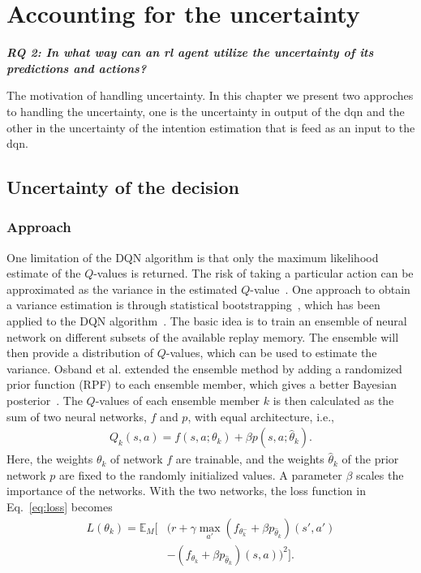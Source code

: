 \chapter{Accounting for the uncertainty}\label{ch:uncertainty}
\begin{center}
	\textit{\textbf{RQ 2: In what way can an \gls{rl} agent utilize the uncertainty of its predictions and actions?}}
	\end{center}
	\vspace{12pt}

The motivation of handling uncertainty. In this chapter we present two approches to handling the uncertainty, one is the uncertainty in output of the \gls{dqn} and the other in the uncertainty of the intention estimation that is feed as an input to the \gls{dqn}.


\section{Uncertainty of the decision}


\subsection{Approach}
One limitation of the DQN algorithm is that only the maximum likelihood estimate of the $Q$-values is returned. The risk of taking a particular action can be approximated as the variance in the estimated $Q$-value~\cite{Garcia2015}. One approach to obtain a variance estimation is through statistical bootstrapping~\cite{Efron1982}, which has been applied to the DQN algorithm~\cite{Osband2016}. The basic idea is to train an ensemble of neural network on different subsets of the available replay memory. The ensemble will then provide a distribution of $Q$-values, which can be used to estimate the variance. Osband et al. extended the ensemble method by adding a randomized prior function (RPF) to each ensemble member, which gives a better Bayesian posterior~\cite{Osband2018}. The $Q$-values of each ensemble member $k$ is then calculated as the sum of two neural networks, $f$ and $p$, with equal architecture, i.e.,
%
\begin{align}
	Q_k(s,a) = f(s,a;\theta_k) + \beta p(s,a;\hat{\theta}_k).
\end{align}
%
Here, the weights $\theta_k$ of network $f$ are trainable, and the weights $\hat{\theta}_k$ of the prior network $p$ are fixed to the randomly initialized values. A parameter $\beta$ scales the importance of the networks. With the two networks, the loss function in Eq.~\ref{eq:loss} becomes
%
\begin{align}
	\label{eq:loss_boot}
	L(\theta_k) = \mathbb{E}_M \Big[ & (r + \gamma \max_{a'} (f_{\theta^-_k}+\beta p_{\hat{\theta}_k})(s',a') \nonumber \\
	& - (f_{\theta_k}+ \beta p_{\hat{\theta}_k})(s,a) )^2 \Big].
\end{align} 

